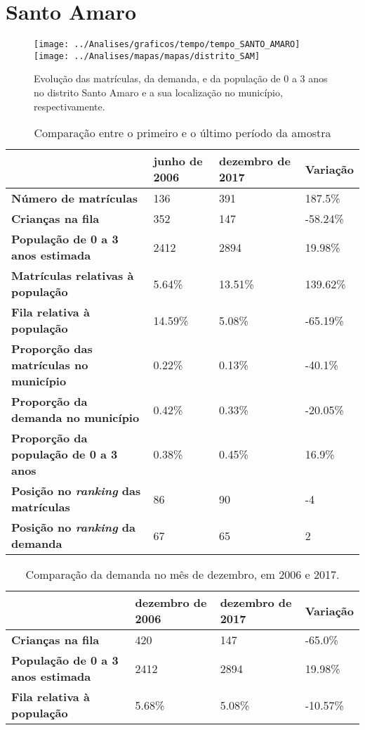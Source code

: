 \section{Santo Amaro}
\begin{figure}[H]
\centering
\texttt{[image: ../Analises/graficos/tempo/tempo\_SANTO\_AMARO]}
\texttt{[image: ../Analises/mapas/mapas/distrito\_SAM]}
\caption{Evolução das matrículas, da demanda, e da população de 0 a 3 anos no distrito Santo Amaro e a sua localização no município, respectivamente.}
\end{figure}
\begin{table}[H]
\begin{tabular}{l|l|l|l}
\textbf{}                                      & \textbf{junho de 2006}       & \textbf{dezembro de 2017}    & \textbf{Variação} \\ \hline
\textbf{Número de matrículas}                  & 136 & 391 & 187.5\% \\ \hline
\textbf{Crianças na fila}                      & 352 & 147 & -58.24\% \\ \hline
\textbf{População de 0 a 3 anos estimada}      & 2412 & 2894 & 19.98\% \\ \hline
\textbf{Matrículas relativas à população}      & 5.64\% & 13.51\% & 139.62\% \\ \hline
\textbf{Fila relativa à população}             & 14.59\% & 5.08\% & -65.19\% \\ \hline
\textbf{Proporção das matrículas no município} & 0.22\% & 0.13\% & -40.1\% \\ \hline
\textbf{Proporção da demanda no município}     & 0.42\% & 0.33\% & -20.05\% \\ \hline
\textbf{Proporção da população de 0 a 3 anos}  & 0.38\% & 0.45\% & 16.9\% \\ \hline
\textbf{Posição no \textit{ranking} das matrículas}     & 86 & 90 & -4 \\ \hline
\textbf{Posição no \textit{ranking} da demanda}         & 67 & 65 & 2 \\ 
\end{tabular}
\caption{Comparação entre o primeiro e o último período da amostra}
\end{table}
\begin{table}[H]
\begin{tabular}{l|l|l|l}
\textbf{}                                 & \textbf{dezembro de 2006} & \textbf{dezembro de 2017} & \textbf{Variação} \\ \hline
\textbf{Crianças na fila}                      & 420 & 147 & -65.0\% \\ \hline
\textbf{População de 0 a 3 anos estimada}      & 2412 & 2894 & 19.98\% \\ \hline
\textbf{Fila relativa à população}             & 5.68\% & 5.08\% & -10.57\% \\
\end{tabular}
\caption{Comparação da demanda no mês de dezembro, em 2006 e 2017.}
\end{table}
